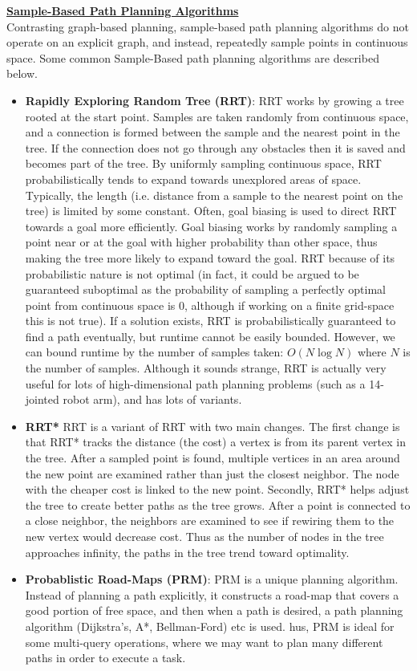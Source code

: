 \documentclass{article}
\begin{document}
\textbf{\underline{Sample-Based Path Planning Algorithms}}\\[1mm]
Contrasting graph-based planning, sample-based path planning algorithms do not operate on an explicit graph, and instead, repeatedly sample points in continuous space. Some common Sample-Based path planning algorithms are described below. 
\begin{itemize}
    \item \textbf{Rapidly Exploring Random Tree (RRT)}: RRT works by growing a tree rooted at the start point. Samples are taken randomly from continuous space, and a connection is formed between the sample and the nearest point in the tree. If the connection does not go through any obstacles then it is saved and becomes part of the tree. By uniformly sampling continuous space, RRT probabilistically tends to expand towards unexplored areas of space. Typically, the length (i.e. distance from a sample to the nearest point on the tree) is limited by some constant. Often, goal biasing is used to direct RRT towards a goal more efficiently. Goal biasing works by randomly sampling a point near or at the goal with higher probability than other space, thus making the tree more likely to expand toward the goal. RRT because of its probabilistic nature is not optimal (in fact, it could be argued to be guaranteed suboptimal as the probability of sampling a perfectly optimal point from continuous space is 0, although if working on a finite grid-space this is not true). If a solution exists, RRT is probabilistically guaranteed to find a path eventually, but runtime cannot be easily bounded. However, we can bound runtime by the number of samples taken: $O(N\log N)$ where $N$ is the number of samples. Although it sounds strange, RRT is actually very useful for lots of high-dimensional path planning problems (such as a 14-jointed robot arm), and has lots of variants. 

    \item \textbf{RRT*} RRT is a variant of RRT with two main changes. The first change is that RRT* tracks the distance (the cost) a vertex is from its parent vertex in the tree. After a sampled point is found, multiple vertices in an area around the new point are examined rather than just the closest neighbor. The node with the cheaper cost is linked to the new point. Secondly, RRT* helps adjust the tree to create better paths as the tree grows. After a point is connected to a close neighbor, the neighbors are examined to see if rewiring them to the new vertex would decrease cost. Thus as the number of nodes in the tree approaches infinity, the paths in the tree trend toward optimality. 

    \item \textbf{Probablistic Road-Maps (PRM)}: PRM is a unique planning algorithm. Instead of planning a path explicitly, it constructs a road-map that covers a good portion of free space, and then when a path is desired, a path planning algorithm (Dijkstra's, A*, Bellman-Ford) etc is used. hus, PRM is ideal for some multi-query operations, where we may want to plan many different paths in order to execute a task. 

\end{itemize}
\end{document}
